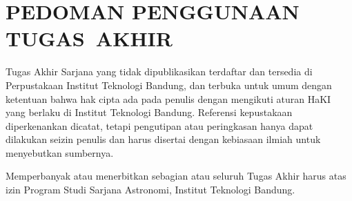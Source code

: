 \chapter{PEDOMAN PENGGUNAAN \mbox{TUGAS AKHIR}}
\label{sec:PEDOMAN PENGGUNAAN TUGAS AKHIR}
\vspace{1.0cm}

Tugas Akhir Sarjana yang tidak dipublikasikan terdaftar dan tersedia di Perpustakaan Institut Teknologi Bandung, dan terbuka untuk umum dengan ketentuan bahwa hak cipta ada pada penulis dengan mengikuti aturan HaKI yang  berlaku di Institut Teknologi Bandung. Referensi kepustakaan diperkenankan dicatat, tetapi pengutipan atau peringkasan hanya dapat dilakukan seizin penulis dan harus disertai dengan kebiasaan ilmiah untuk menyebutkan sumbernya.

Memperbanyak atau menerbitkan sebagian atau seluruh Tugas Akhir harus atas izin Program Studi Sarjana Astronomi, Institut Teknologi Bandung.
